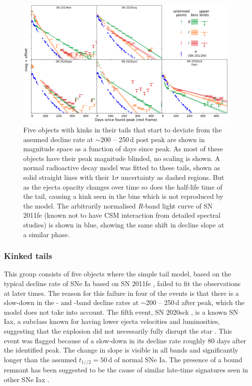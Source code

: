 \documentclass[a4paper,oneside,12pt, class=Latex/Classes/PhDthesisPSnPDF, crop=false]{standalone}
\begin{document}
\begin{figure}
 \centering
 \includegraphics[width=\textwidth]{../Images/chapter_3/kinktails_plots.png}
 \caption{Five objects with kinks in their tails that start to deviate from the assumed decline rate at $\sim$200 -- 250\,d post peak are shown in magnitude space as a function of days since peak. As most of these objects have their peak magnitude blinded, no scaling is shown. A normal radioactive decay model was fitted to these tails, shown as solid straight lines with their $1\sigma$ uncertainty as dashed regions. But as the ejecta opacity changes over time so does the half-life time of the tail, causing a kink seen in the bins which is not reproduced by the model. The arbitrarily normalised \textit{R}-band light curve of SN 2011fe (known not to have CSM interaction from detailed spectral studies) \citep{spec_Lijiang-2.4m} is shown in blue, showing the same shift in decline slope at a similar phase.}
 \label{kink_plots}
\end{figure}


\subsubsection{Kinked tails}
\label{kink_tails}
This group consists of five objects where the simple tail model, based on the typical decline rate of SNe Ia based on SN 2011fe \citep{Georgios_11fe}, failed to fit the observations at later times. The reason for this failure in four of the events is that there is a slow-down in the \ztfr- and \ztfi-band decline rates at $\sim$200 -- 250\,d after peak, which the model does not take into account. The fifth event, SN 2020sck \citep{2020sck_Iax}, is a known SN Iax, a subclass known for having lower ejecta velocities and luminosities, suggesting that the explosion did not necessarily fully disrupt the star \citep{Iax_model_1, Iax_model_2}. This event was flagged because of a slow-down in its decline rate roughly 80 days after the identified peak. The change in slope is visible in all bands and significantly longer than the assumed $t_{1//2} = 50$\,d of normal SNe Ia. The presence of a bound remnant has been suggested to be the cause of similar late-time signatures seen in other SNe Iax \citep{Kawabata_iax14dt, close_Iax, Camacho-Neves_iax14dt}.
\end{document}
